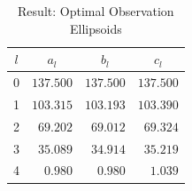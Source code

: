 {\begin{table}[h]
\begin{tabular}{|c||r|r|r|}
        $l$ & \multicolumn{1}{|c|}{$a_l$} & \multicolumn{1}{|c|}{$b_l$} & \multicolumn{1}{|c|}{$c_l$}   \\
        \hline
        0   & $137.500$ & $137.500$ & $137.500$ \\
        1   & $103.315$ & $103.193$ & $103.390$ \\
        2   &  $69.202$ &  $69.012$ &  $69.324$ \\
        3   &  $35.089$ &  $34.914$ &  $35.219$ \\
        4   &   $0.980$ &   $0.980$ &   $1.039$ \\
        \hline
    \end{tabular}
    \caption{Result: Optimal Observation Ellipsoids}
    \label{tab:res-optimal-ellipsoids}
\end{table}
}